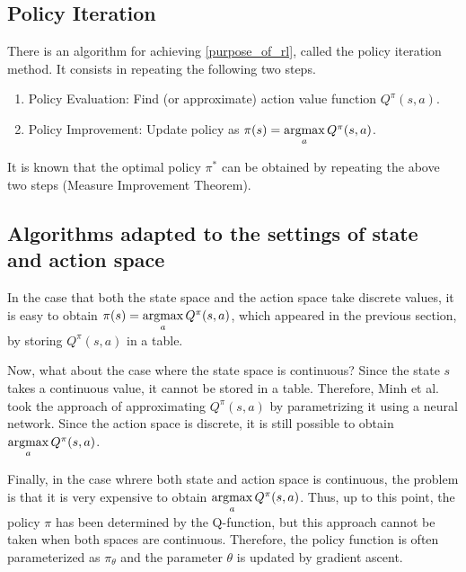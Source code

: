 \documentclass[english, dvipdfmx]{ampmt}             %
\newcommand{\argmax}{\mathop{\rm argmax}\limits}
\begin{document}
\subsection{Policy Iteration}
There is an algorithm for achieving \eqref{purpose_of_rl}, called the policy iteration method. It consists in repeating the following two steps.
\begin{enumerate}
	\item Policy Evaluation: Find (or approximate) action value function $Q^{\pi}(s,a)$.
	\item Policy Improvement: Update policy as $\pi(s)=\argmax_aQ^{\pi}(s,a)$.
\end{enumerate}
It is known that the optimal policy $\pi^{*}$ can be obtained by repeating the above two steps (Measure Improvement Theorem).





\subsection{Algorithms adapted to the settings of state and action space}
\label{sec:policy_improvement}
In the case that both the state space and the action space take discrete values, it is easy to obtain
$\pi(s)=\argmax_aQ^{\pi}(s,a)$, which appeared in the previous section, by storing $Q^{\pi}(s,a)$ in a table.\par
Now, what about the case where the state space is continuous? Since the state $s$ takes a continuous value, it cannot be stored in a table. Therefore, Minh et al.\cite{DQN} took the approach of approximating $Q^{\pi}(s,a)$ by parametrizing it using a neural network. Since the action space is discrete, it is still possible to obtain $\argmax_aQ^{\pi}(s,a)$. \par
Finally, in the case whrere both state and action space is continuous, the problem is that it is very expensive to obtain $\argmax_aQ^{\pi}(s,a)$. Thus, up to this point, the policy $\pi$ has been determined by the Q-function, but this approach cannot be taken when both spaces are continuous. 
Therefore, the policy function is often parameterized as $\pi_{\theta}$ and the parameter $\theta$ is updated by gradient ascent. 
\end{document}
